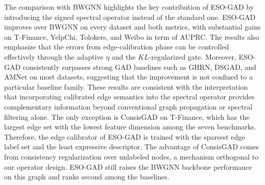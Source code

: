 The comparison with BWGNN highlights the key contribution of ESO-GAD by introducing the signed spectral operator instead of the standard one.
ESO-GAD improves over BWGNN on every dataset and both metrics, with substantial gains on T-Finance, YelpChi, Tolokers, and Weibo in term of AUPRC.
The results also emphasize that the errors from edge-calibration phase can be controlled effectively through the adaptive $\eta$ and the $KL$-regularized gate. 
Moreover, ESO-GAD consistently surpasses strong GAD baselines such as GHRN, DSGAD, and AMNet on most datasets, suggesting that the improvement is not confined to a particular baseline family.
These results are consistent with the interpretation that incorporating calibrated edge semantics into the spectral operator provides complementary information beyond conventional graph propagation or spectral filtering alone.
The only exception is ConsisGAD on T-Finance, which has the largest edge set with the lowest feature dimension among the seven benchmarks.
Therefore, the edge calibrator of ESO-GAD is trained with the sparsest edge label set and the least expressive descriptor.
The advantage of ConsisGAD comes from consistency regularization over unlabeled nodes, a  mechanism orthogonal to our operator design.
ESO-GAD still raises the BWGNN backbone performance on this graph and ranks second among the baselines.




